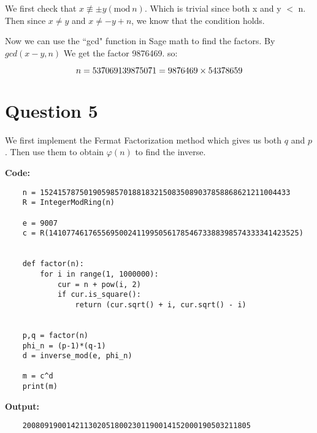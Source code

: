 \documentclass{article}
\numberwithin{equation}{subsection}
\begin{document}
	We first check that $x \not \equiv \pm y (\textrm{mod}\ n)$. Which is trivial since 
	both x and y $<$ n. Then since $x\not = y$ and $x\not = -y+n$, we know that the condition holds.

	Now we can use the ``gcd" function in Sage math to find the factors. By $gcd(x-y, n)$
	We get the factor 9876469. so:

\begin{equation}\notag
	n = 537069139875071 = 9876469 \times 54378659	
\end{equation}

\newpage
	\thispagestyle{fancy}


\section*{Question 5}
We first implement the Fermat Factorization method which gives us both $q$ and $p$. Then
use them to obtain $\varphi(n)$ to find the inverse.

\textbf{Code:}
\begin{lstlisting}
	n = 152415787501905985701881832150835089037858868621211004433
	R = IntegerModRing(n)

	e = 9007
	c = R(141077461765569500241199505617854673388398574333341423525)


	def factor(n):
		for i in range(1, 1000000):
			cur = n + pow(i, 2)
			if cur.is_square():
				return (cur.sqrt() + i, cur.sqrt() - i)


	p,q = factor(n)
	phi_n = (p-1)*(q-1)
	d = inverse_mod(e, phi_n)

	m = c^d
	print(m)
\end{lstlisting}

\textbf{Output:}
\begin{lstlisting}
	2008091900142113020518002301190014152000190503211805
\end{lstlisting}
\end{document}
